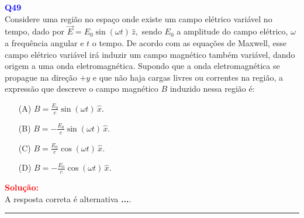\documentclass[a4paper,12pt]{article}
\begin{document}
\begin{flushleft}
\textbf{\textcolor{blue}{\Large Q49}}\\
\noindent
Considere uma região no espaço onde existe um campo elétrico variável no tempo, dado por $\vec{E} = E_0 \sin(\omega t) \, \hat{z},$
sendo \(E_0\) a amplitude do campo elétrico, \(\omega\) a frequência angular e \(t\) o tempo. De acordo com as equações de Maxwell, 
esse campo elétrico variável irá induzir um campo magnético também variável, dando origem a uma onda eletromagnética. Supondo que a 
onda eletromagnética se propague na direção \(+y\) e que não haja cargas livres ou correntes na região, a expressão que descreve o 
campo magnético \(B\) induzido nessa região é:


\begin{itemize}
\item[(A)] $B = \frac{E_0}{c} \sin(\omega t) \, \hat{x}.$
\item[(B)] $B = -\frac{E_0}{c} \sin(\omega t) \, \hat{x}.$
\item[(C)] $B = \frac{E_0}{c} \cos(\omega t) \, \hat{x}.$
\item[(D)] $B = -\frac{E_0}{c} \cos(\omega t) \, \hat{x}.$
\end{itemize}

\vspace{0.5cm}

\textcolor{red}{\textbf{Solução:}}\\


A resposta correta é alternativa \colorbox{green!50}{\textbf{...}}.
\end{flushleft}

\noindent\rule{\linewidth}{0.6pt}\\
\end{document}
